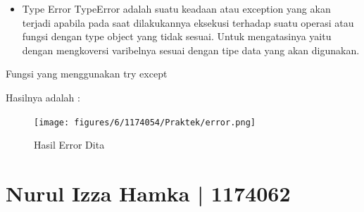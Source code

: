\begin{enumerate}
\begin{itemize}
\item Type Error
TypeError adalah suatu keadaan atau exception yang akan terjadi apabila pada saat dilakukannya eksekusi terhadap suatu operasi atau fungsi dengan type object yang tidak sesuai. Untuk mengatasinya yaitu dengan mengkoversi varibelnya sesuai dengan tipe data yang akan digunakan.
\end{itemize}

Fungsi yang menggunakan try except

Hasilnya adalah : 
\begin{figure}[H]
	\texttt{[image: figures/6/1174054/Praktek/error.png]}
	\centering
	\caption{Hasil Error Dita}
\end{figure}

\end{enumerate}


\section{Nurul Izza Hamka | 1174062}
